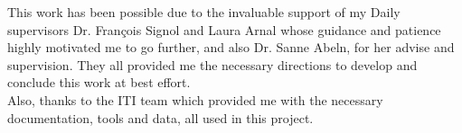 This work has been possible due to the invaluable support of my Daily supervisors Dr. François Signol and Laura Arnal whose guidance and patience highly motivated me to go further, and also Dr. Sanne Abeln, for her advise and supervision. They all provided me the necessary directions to develop and conclude this work at best effort.
\\

Also, thanks to the ITI team which provided me with the necessary documentation, tools and data, all used in this project.

